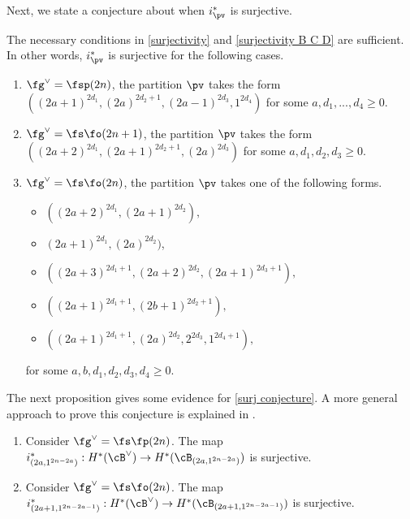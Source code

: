 \documentclass[12pt]{amsart}
\begin{document}
Next, we state a conjecture about when $i_{\pv}^*$ is surjective. 
\begin{conj} \label{surj conjecture}
The necessary conditions in \cref{surjectivity} and \cref{surjectivity B C D} are sufficient. In other words, $i_{\pv}^*$ is surjective for the following cases.
\begin{enumerate}
    \item $\fg^\vee= \fsp(2n)$, the partition $\pv$ takes the form $((2a+1)^{2d_1},(2a)^{2d_2+1},(2a-1)^{2d_3}, 1^{2d_4})$ for some $a, d_1,...,d_4\geqslant 0$.
    \item $\fg^\vee= \fs\fo(2n+1)$, the partition $\pv$ takes the form $((2a+2)^{2d_1}, (2a+1)^{2d_2+1}, (2a)^{2d_3})$ for some $a, d_1, d_2, d_3\geqslant 0$.
    \item $\fg^\vee= \fs\fo(2n)$, the partition $\pv$ takes one of the following forms.
    \begin{itemize}
        \item $((2a+2)^{2d_1}, (2a+1)^{2d_2}),$ 
        \item $(2a+1)^{2d_1}, (2a)^{2d_2})$,
        \item $((2a+3)^{2d_1+1}, (2a+2)^{2d_2}, (2a+1)^{2d_3+1}),$
        \item $((2a+1)^{2d_1+1},(2b+1)^{2d_2+1}),$
        \item $((2a+1)^{2d_1+1},(2a)^{2d_2}, 2^{2d_3},1^{2d_4+1}),$
    \end{itemize}
    for some $a, b, d_1, d_2, d_3, d_4\geqslant 0$.
\end{enumerate}
\end{conj}
The next proposition gives some evidence for \cref{surj conjecture}. A more general approach to prove this conjecture is explained in \cite{hoang2}.
\begin{prop} \label{b=1} \leavevmode
\begin{enumerate}
    \item Consider $\fg^\vee= \fs\fp(2n)$. The map $i_{(2a,1^{2n-2a})}^*: H^*(\cB^\vee)\rightarrow H^*(\cB_{(2a,1^{2n-2a})})$ is surjective.
    \item Consider $\fg^\vee= \fs\fo(2n)$. The map $i_{(2a+1,1^{2n-2a-1})}^*: H^*(\cB^\vee)\rightarrow H^*(\cB_{(2a+1,1^{2n-2a-1})})$ is surjective.
\end{enumerate}
    
\end{prop}
\end{document}
